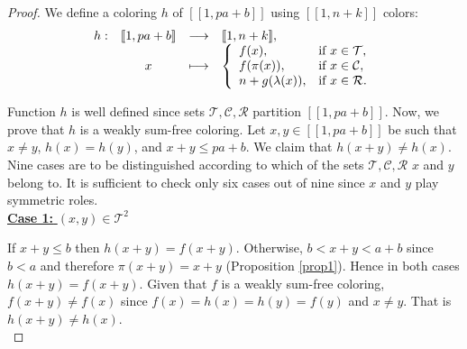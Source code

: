 \documentclass{article}
\newtheorem{computational theorem}[definition]{Computational Theorem}
\begin{document}
\begin{proof}
We define a coloring \(h\) of \([\![1, p a + b]\!]\) using \( [\![1,n+k]\!]\) colors:
\[
\begin{array}{c c c l}
	h : & [\![1, p a + b]\!] & \longrightarrow & [\![1,n+k]\!],\\
	& x & \longmapsto &
	\left\{ \begin{array}{l l}
		f(x), & \text{if}~x \in \mathcal{T}, \\
		f(\pi(x)), & \text{if}~x \in \mathcal{C}, \\
		n + g(\lambda(x)), & \text{if}~x \in \mathcal{R}.
	\end{array} \right.
\end{array}
\]

Function \(h\) is well defined since sets \(\mathcal{T}, \mathcal{C}, \mathcal{R}\) partition \([\![1, p a + b]\!]\).
Now, we prove that \(h\) is a weakly sum-free coloring. Let \(x,y \in [\![1, p a + b]\!]\) be such that \(x \neq y\),
\(h(x) = h(y)\), and \(x+y \leqslant p a+ b\). We claim that \(h(x+y) \neq h(x)\). Nine cases are to be distinguished
according to which of the sets \(\mathcal{T}, \mathcal{C}, \mathcal{R}\) \(x\) and \(y\) belong to. It is
sufficient to check only six cases out of nine since \(x\) and \(y\) play symmetric roles. \\

\noindent \underline{\textbf{Case 1:} \((x,y) \in \mathcal{T}^2\)}
\par
If \(x + y \leqslant b\) then \(h(x+y)=f(x+y)\). Otherwise, \(b < x+y < a+b\) since \(b < a\) and
therefore \(\pi(x + y) = x +y\) (Proposition \ref{prop1}). Hence in both cases \(h(x+y)=f(x+y)\). Given that
\(f\) is a weakly sum-free coloring, \(f(x + y) \neq f(x)\) since \(f(x)=h(x)=h(y)=f(y)\) and \(x \neq y \). That
is \(h(x + y) \neq h(x)\). \\


\end{proof}
\end{document}
